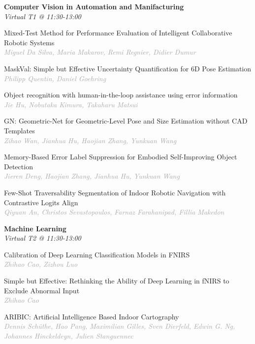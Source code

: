 \begin{multicols*}{2}
\normalsize \textbf{Computer Vision in Automation and Manifacturing}\\
\small \textit{Virtual T1 @ 11:30-13:00}

\small Mixed-Test Method for Performance Evaluation of Intelligent Collaborative Robotic Systems\\ 
\footnotesize \textcolor{darkgray}{\textit{Miguel Da Silva, Maria  Makarov, Remi  Regnier, Didier  Dumur}}

\small MaskVal: Simple but Effective Uncertainty Quantification for 6D Pose Estimation\\ 
\footnotesize \textcolor{darkgray}{\textit{Philipp Quentin, Daniel  Goehring}}

\small Object recognition with human-in-the-loop assistance using error information\\ 
\footnotesize \textcolor{darkgray}{\textit{Jie Hu, Nobutaka  Kimura, Takaharu  Matsui}}

\small GN: Geometric-Net for Geometric-Level Pose and Size Estimation without CAD Templates\\ 
\footnotesize \textcolor{darkgray}{\textit{Zihao Wan, Jianhua  Hu, Haojian  Zhang, Yunkuan  Wang}}

\small Memory-Based Error Label Suppression for Embodied Self-Improving Object Detection\\ 
\footnotesize \textcolor{darkgray}{\textit{Jieren Deng, Haojian  Zhang, Jianhua  Hu, Yunkuan  Wang}}

\small Few-Shot Traversability Segmentation of Indoor Robotic Navigation with Contrastive Logits Align\\ 
\footnotesize \textcolor{darkgray}{\textit{Qiyuan An, Christos  Sevastopoulos, Farnaz  Farahanipad, Fillia  Makedon}}

\normalsize \textbf{Machine Learning}\\
\small \textit{Virtual T2 @ 11:30-13:00}

\small Calibration of Deep Learning Classification Models in FNIRS\\ 
\footnotesize \textcolor{darkgray}{\textit{Zhihao Cao, Zizhou  Luo}}

\small Simple but Effective: Rethinking the Ability of Deep Learning in fNIRS to Exclude Abnormal Input\\ 
\footnotesize \textcolor{darkgray}{\textit{Zhihao Cao}}

\small ARIBIC: Artificial Intelligence Based Indoor Cartography\\ 
\footnotesize \textcolor{darkgray}{\textit{Dennis Schüthe, Hao  Pang, Maximilian  Gilles, Sven  Dierfeld, Edwin G.  Ng, Johannes  Hinckeldeyn, Julien  Stanguennec}}


\end{multicols*}
